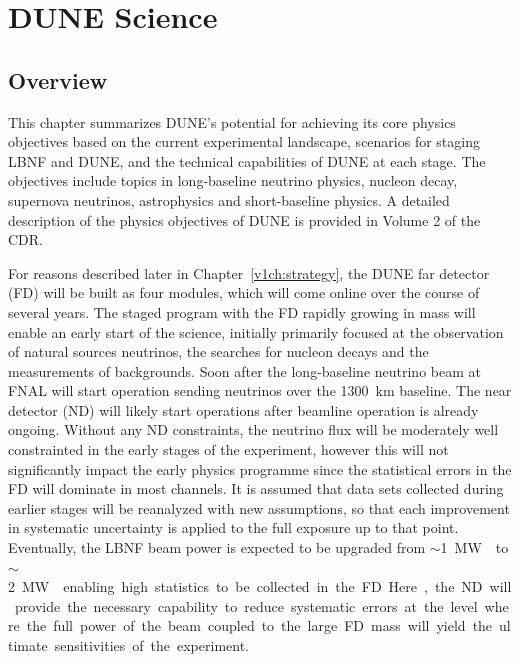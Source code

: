 
\chapter{DUNE Science}
\label{v1ch:science}

\section{Overview} %

This chapter summarizes DUNE's potential for achieving its core
physics objectives based on the current %
experimental landscape, scenarios for staging LBNF and DUNE, and 
the technical capabilities of DUNE at each stage. 
The objectives include topics in long-baseline neutrino 
physics, nucleon decay, supernova neutrinos, astrophysics and short-baseline physics.
A detailed description of the physics objectives of DUNE is provided in
Volume 2 of the CDR.

For reasons described later in Chapter~\ref{v1ch:strategy}, the DUNE far detector (FD)
will be built as four  modules, which will come online over the course
of several years. The staged program with the FD rapidly growing in mass will enable
an early start of the science, initially primarily focused at the observation of 
natural sources neutrinos, the searches for nucleon decays and the measurements
of backgrounds. Soon after the long-baseline neutrino beam at FNAL will start operation
sending neutrinos over the 1300~km baseline.
The near detector (ND) will likely start operations
after beamline operation is already ongoing.  Without any ND constraints,
the neutrino flux will be moderately well constrainted in the early stages of the
experiment, however this will not significantly impact the early physics programme
since the statistical errors in the FD
will dominate in most channels. 
It is assumed that data sets collected during earlier stages will be reanalyzed with new
assumptions, so that each improvement in systematic uncertainty is applied
to the full exposure up to that point.
Eventually, the LBNF beam power is expected to be upgraded
from $\sim$\SI{1}\MW{} to $\sim$\SI{2}\MW{} enabling high statistics to be
collected in the FD. Here, the ND will provide the necessary capability to
reduce systematic errors at the level where the full power of the beam 
coupled to the large FD mass will yield the ultimate sensitivities of the
experiment.

